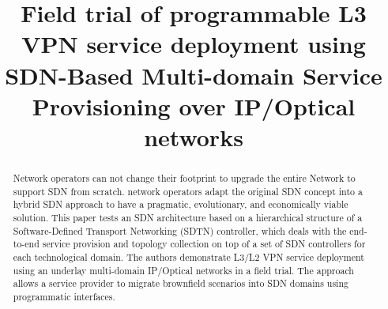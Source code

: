 \documentclass[10pt, conference]{IEEEtran}
\begin{document}
\title{Field trial of programmable L3 VPN service deployment using SDN-Based Multi-domain Service Provisioning over IP/Optical networks}

\author{
}

\maketitle

\begin{abstract}
Network operators can not change their footprint to upgrade the entire Network to support SDN from scratch.  network operators adapt the original SDN concept into a hybrid SDN approach to have a pragmatic, evolutionary, and economically viable solution. This paper tests an SDN architecture based on a hierarchical structure of a Software-Defined Transport Networking (SDTN) controller, which deals with the end-to-end service provision and topology collection on top of a set of SDN controllers for each technological domain. The authors demonstrate L3/L2 VPN service deployment using an underlay multi-domain IP/Optical networks in a field trial. The approach allows a service provider to migrate brownfield scenarios into SDN domains using programmatic interfaces.

\end{abstract}
\end{document}

